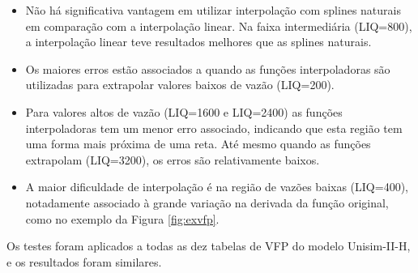 \documentclass[final,5p]{elsarticle}
\numberwithin{equation}{section}
\begin{document}
        \begin{itemize}
            \item Não há significativa vantagem em utilizar interpolação com splines naturais em comparação com a interpolação linear. Na faixa intermediária (LIQ=800), a interpolação linear teve resultados melhores que as splines naturais.
            \item Os maiores erros estão associados a quando as funções interpoladoras são utilizadas para extrapolar valores baixos de vazão (LIQ=200).
            \item Para valores altos de vazão (LIQ=1600 e LIQ=2400) as funções interpoladoras tem um menor erro associado, indicando que esta região tem uma forma mais próxima de uma reta. Até mesmo quando as funções extrapolam (LIQ=3200), os erros são relativamente baixos.
            \item A maior dificuldade de interpolação é na região de vazões baixas (LIQ=400), notadamente associado à grande variação na derivada da função original, como no exemplo da Figura \ref{fig:exvfp}.
        \end{itemize}

        Os testes foram aplicados a todas as dez tabelas de VFP do modelo Unisim-II-H, e os resultados foram similares.
\end{document}
